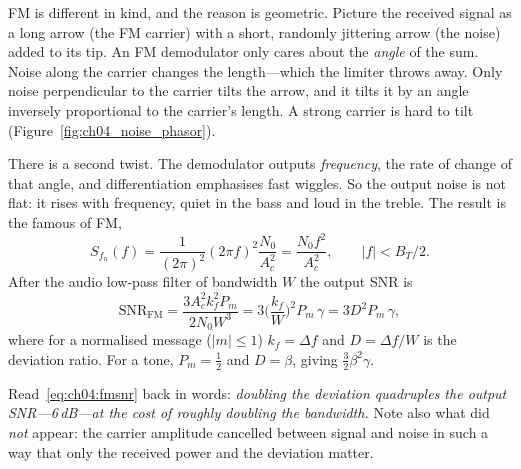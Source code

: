 FM is different in kind, and the reason is geometric. Picture the received signal as a long arrow (the FM
carrier) with a short, randomly jittering arrow (the noise) added to its tip. An FM demodulator only cares
about the \emph{angle} of the sum. Noise along the carrier changes the length---which the limiter throws
away. Only noise perpendicular to the carrier tilts the arrow, and it tilts it by an angle inversely
proportional to the carrier's length. A strong carrier is hard to tilt (Figure~\ref{fig:ch04_noise_phasor}).


There is a second twist. The demodulator outputs \emph{frequency}, the rate of change of that angle, and
differentiation emphasises fast wiggles. So the output noise is not flat: it rises with frequency, quiet in
the bass and loud in the treble. The result is the famous  of FM,
\begin{equation}
S_{f_n}(f)=\frac{1}{(2\pi)^2}(2\pi f)^2\frac{N_0}{A_c^2}=\frac{N_0f^2}{A_c^2},\qquad |f|<B_T/2.
\label{eq:ch04:parabolic}
\end{equation}
After the audio low-pass filter of bandwidth $W$ the output SNR is
\begin{equation}
\text{SNR}_{\text{FM}}=\frac{3A_c^2k_f^2P_m}{2N_0W^3}=3\Big(\frac{k_f}{W}\Big)^2P_m\,\gamma
=3D^2P_m\,\gamma,
\label{eq:ch04:fmsnr}
\end{equation}
where for a normalised message ($|m|\le1$) $k_f=\Delta f$ and $D=\Delta f/W$ is the deviation ratio. For a
tone, $P_m=\frac12$ and $D=\beta$, giving $\frac32\beta^2\gamma$.

Read~\eqref{eq:ch04:fmsnr} back in words: \emph{doubling the deviation quadruples the output SNR---6\,dB---at
the cost of roughly doubling the bandwidth.} Note also what did \emph{not} appear: the carrier amplitude
cancelled between signal and noise in such a way that only the received power and the deviation matter.

